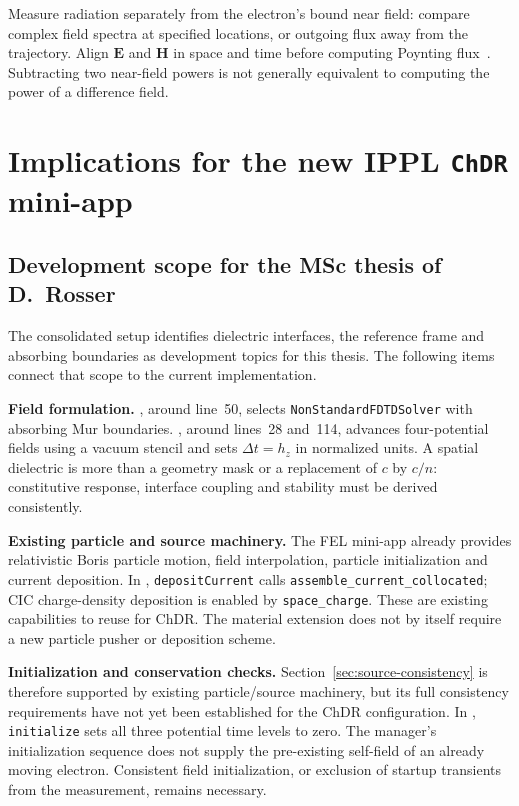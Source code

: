 \documentclass[11pt,a4paper]{article}
\newcommand{\code}[1]{\texttt{\small #1}}
\numberwithin{equation}{section}
\begin{document}
Measure radiation separately from the electron's bound near field:
compare complex field spectra at specified locations, or outgoing flux
away from the trajectory. Align \(\mathbf E\) and \(\mathbf H\) in space
and time before computing Poynting flux~\cite{oskooi2010meep}.
Subtracting two near-field powers is not generally equivalent to computing
the power of a difference field.

\section{Implications for the new IPPL {\tt ChDR} mini-app}
\label{sec:ippl}

\subsection{Development scope for the MSc thesis of D.~Rosser}

The consolidated setup identifies dielectric interfaces, the reference frame
and absorbing boundaries as development topics for this thesis. The following
items connect that scope to the current implementation.

\textbf{Field formulation.}
, around line~50, selects
\code{NonStandardFDTDSolver} with absorbing Mur boundaries.
, around lines~28
and~114, advances four-potential fields using a vacuum stencil and sets
\(\Delta t=h_z\) in normalized units. A spatial dielectric is more than a
geometry mask or a replacement of \(c\) by \(c/n\): constitutive response,
interface coupling and stability must be derived consistently.

\textbf{Existing particle and source machinery.}
The FEL mini-app already provides relativistic Boris particle motion,
field interpolation, particle initialization and current deposition.
In , \code{depositCurrent}
calls \code{assemble\_current\_collocated}; CIC charge-density deposition
is enabled by \code{space\_charge}. These are existing capabilities to
reuse for ChDR. The material extension does not by itself require a new
particle pusher or deposition scheme.

\textbf{Initialization and conservation checks.}
Section~\ref{sec:source-consistency} is therefore supported by existing
particle/source machinery, but its full consistency requirements have
not yet been established for the ChDR configuration.
In ,
\code{initialize} sets all three potential time levels to zero.
The manager's initialization sequence does not supply the pre-existing
self-field of an already moving electron. Consistent field initialization,
or exclusion of startup transients from the measurement, remains necessary.
\end{document}
